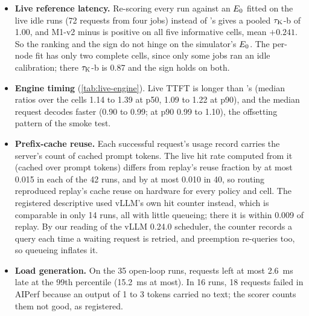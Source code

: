 \begin{itemize}
  \item \textbf{Live reference latency.} Re-scoring every run against an $E_0$ fitted on the live
    idle runs (72 requests from four jobs) instead of \ais{}'s gives a pooled $\tau_{\mathrm{K}}$-b of 1.00,
    and M1-v2 minus  is positive on all five informative cells, mean $+0.241$. So the
    ranking and the sign do not hinge on the simulator's $E_0$. The per-node fit has only two
    complete cells, since only some jobs ran an idle calibration; there $\tau_{\mathrm{K}}$-b is 0.87 and the
    sign holds on both.
  \item \textbf{Engine timing} (\cref{tab:live-engine}). Live TTFT is longer than \ais{}'s (median
    ratios over the cells 1.14 to 1.39 at p50, 1.09 to 1.22 at p90), and the median request decodes
    faster (0.90 to 0.99; at p90 0.99 to 1.10), the offsetting pattern of the smoke test.
  \item \textbf{Prefix-cache reuse.} Each successful request's usage record carries the server's
    count of cached prompt tokens. The live hit rate computed from it (cached over prompt tokens)
    differs from replay's reuse fraction by at most 0.015 in each of the 42 runs, and by at most 0.010
    in 40, so routing reproduced replay's cache reuse on hardware for every policy and cell. The
    registered descriptive used vLLM's own hit counter instead, which is comparable in only 14 runs,
    all with little queueing; there it is within 0.009 of replay. By our reading of the vLLM 0.24.0
    scheduler, the counter records a query each time a waiting request is retried, and preemption
    re-queries too, so queueing inflates it.
  \item \textbf{Load generation.} On the 35 open-loop runs, requests left at most \SI{2.6}{ms} late
    at the 99th percentile (\SI{15.2}{ms} at most). In 16 runs, 18 requests failed in AIPerf because
    an output of 1 to 3 tokens carried no text; the scorer counts them not good, as registered.
\end{itemize}

